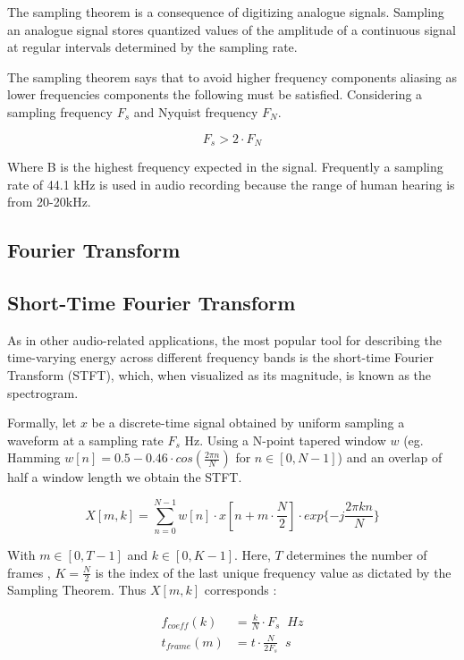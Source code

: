 The sampling theorem is a consequence of digitizing analogue signals. Sampling
an analogue signal stores quantized values of the amplitude of a continuous
signal at regular intervals determined by the sampling rate.

The sampling theorem says that to avoid higher frequency components aliasing as
lower frequencies components the following must be satisfied. Considering a
sampling frequency $F_{s}$ and Nyquist frequency $F_{N}$.

\begin{equation}
  F_{s} > 2\cdot F_{N}
\end{equation}

Where B is the highest frequency expected in the signal. Frequently a sampling
rate of 44.1 kHz is used in audio recording because the range of human hearing
is from 20-20kHz.


\subsection{Fourier Transform}
\subsection{Short-Time Fourier Transform}

As in other audio-related applications, the most popular tool for describing the
time-varying energy across different frequency bands is the short-time Fourier
Transform (STFT), which, when visualized as its magnitude, is known as the
spectrogram.

Formally, let $x$ be a discrete-time signal obtained by uniform sampling a
waveform at a sampling rate $F_{s}$ Hz. Using a N-point tapered window $w$ (eg.
Hamming $w[n] = 0.5-0.46\cdot cos(\frac{2\pi n}{N})$ for
$n\in\left[0,N-1\right]$) and an overlap of half a window length we obtain the
STFT.

\begin{equation}
  X [m,k] = \sum_{n=0}^{N-1}w[n]\cdot x[n + m\cdot\frac{N}{2}]\cdot exp\{-j\frac{2\pi k n }{N}\}
\end{equation}

With $m\in\left[0,T-1\right]$ and $k\in\left[0,K-1\right]$. Here, $T$ determines
the number of frames , $K = \frac{N}{2}$ is the index of the last unique
frequency value as dictated by the Sampling Theorem. Thus $X[m,k]$ corresponds :

\begin{align}
  f_{coeff}(k) & = \frac{k}{N} \cdot F_{s} \;\; Hz \\
  t_{frame}(m) & = t \cdot \frac{N}{2F_{s}} \;\; s
\end{align}


